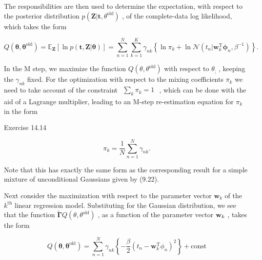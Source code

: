\documentclass[
  10
]{article}
\begin{document}
The responsibilities are then used to determine the expectation, with
respect to the posterior distribution
\(p ( \mathbf { Z } | \mathbf { t } , \theta ^ { \mathrm { o l d } } )\)
, of the complete-data log likelihood, which takes the form

\[
Q (\boldsymbol {\theta}, \boldsymbol {\theta} ^ {\mathrm{old}}) = \mathbb {E} _ {\mathbf {Z}} \left[ \ln p (\mathbf {t}, \mathbf {Z} | \boldsymbol {\theta}) \right] = \sum_ {n = 1} ^ {N} \sum_ {k = 1} ^ {K} \gamma_ {n k} \left\{\ln \pi_ {k} + \ln \mathcal {N} (t _ {n} | \mathbf {w} _ {k} ^ {\mathrm{T}} \boldsymbol {\phi} _ {n}, \beta^ {- 1}) \right\}.
\]

In the M step, we maximize the function
\(Q ( \theta , \theta ^ { \mathrm { o l d } } )\) with respect to
\(\theta _ { ; }\) , keeping the \(\gamma _ { n k }\) fixed. For the
optimization with respect to the mixing coefficients \(\pi _ { k }\) we
need to take account of the constraint
\(\begin{array} { r } { \sum _ { k } \pi _ { k } = 1 } \end{array}\) ,
which can be done with the aid of a Lagrange multiplier, leading to an
M-step re-estimation equation for \(\pi _ { k }\) in the form

Exercise 14.14

\[
\pi_ {k} = \frac {1}{N} \sum_ {n = 1} ^ {N} \gamma_ {n k}.\tag{14.38}
\]

Note that this has exactly the same form as the corresponding result for
a simple mixture of unconditional Gaussians given by (9.22).

Next consider the maximization with respect to the parameter vector
\(\mathbf { w } _ { k }\) of the \(k ^ { \mathrm { t h } }\) linear
regression model. Substituting for the Gaussian distribution, we see
that the function
\(\mathbf { \widetilde { \mathbf { \Gamma } } } Q ( \theta , \theta ^ { \mathrm { o l d } } )\)
, as a function of the parameter vector \({ \bf w } _ { k }\) , takes
the form

\[
Q (\pmb {\theta}, \pmb {\theta} ^ {\mathrm{old}}) = \sum_ {n = 1} ^ {N} \gamma_ {n k} \left\{- \frac {\beta}{2} \left(t _ {n} - \mathbf {w} _ {k} ^ {\mathrm{T}} \phi_ {n}\right) ^ {2} \right\} + \mathrm{const}\tag{14.39}
\]
\end{document}
